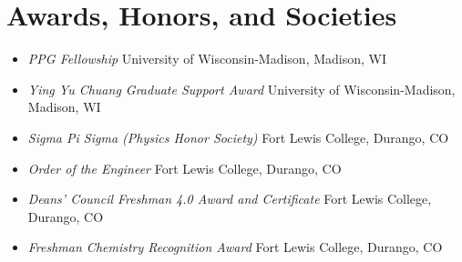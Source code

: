 \section{Awards, Honors, and Societies}

\begin{itemize}
    \item \textit{PPG Fellowship} \hfill University of Wisconsin-Madison, Madison, WI
    \item \textit{Ying Yu Chuang Graduate Support Award} \hfill University of Wisconsin-Madison, Madison, WI
    \item \textit{Sigma Pi Sigma (Physics Honor Society)} \hfill Fort Lewis College, Durango, CO
    \item \textit{Order of the Engineer} \hfill Fort Lewis College, Durango, CO
    \item \textit{Deans' Council Freshman 4.0 Award and Certificate} \hfill Fort Lewis College, Durango, CO
    \item \textit{Freshman Chemistry Recognition Award} \hfill Fort Lewis College, Durango, CO
\end{itemize}
